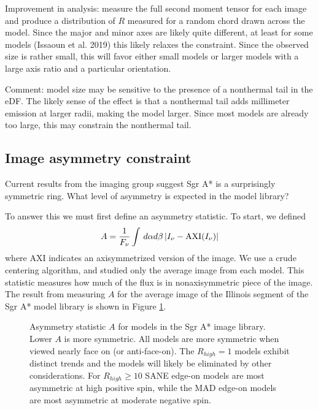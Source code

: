 \documentclass[twocolumn,tighten,dvipsnames]{aastex63}
\newcommand\<{{\langle}}
\renewcommand\>{{\rangle}} %
\begin{document}
Improvement in analysis: measure the full second moment tensor for each image and produce a distribution of $R$ measured for a random chord drawn across the model.  Since the major and minor axes are likely quite different, at least for some models (Issaoun et al. 2019) this likely relaxes the constraint.  Since the observed size is rather small, this will favor either small models or larger models with a large axis ratio and a particular orientation.

Comment: model size may be sensitive to the presence of a nonthermal tail in the eDF.  The likely sense of the effect is that a nonthermal tail adds millimeter emission at larger radii, making the model larger.  Since most models are already too large, this may constrain the nonthermal tail.

\subsection{Image asymmetry constraint}
\label{sec:asymconst}

Current results from the imaging group suggest Sgr A* is a surprisingly symmetric ring.   What level of asymmetry is expected in the model library?

To answer this we must first define an asymmetry statistic.  To start, we defined
\begin{equation}
    A = \frac{1}{F_\nu} \int \, d\alpha d\beta \, | I_\nu - {\rm AXI}(I_\nu) |
\end{equation}
where AXI indicates an axisymmetrized version of the image.  We use a crude centering algorithm, and studied only the average image from each model.  This statistic measures how much of the flux is in nonaxisymmetric piece of the image.   The result from measuring $A$ for the average image of the Illinois segment of the Sgr A* model library is shown in Figure \ref{fig:asymm}.

\begin{figure}\label{fig:asymm}
    \caption{Asymmetry statistic $A$ for models in the Sgr A* image library.  Lower $A$ is more symmetric.  All models are more symmetric when viewed nearly face on (or anti-face-on).  The $R_{high} = 1$ models exhibit distinct trends and the models will likely be eliminated by other considerations.  For $R_{high} \ge 10$ SANE edge-on models are most asymmetric at high positive spin, while the MAD edge-on models are most asymmetric at moderate negative spin.}
\end{figure}
\end{document}

